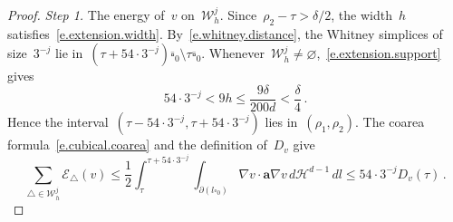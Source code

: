 \documentclass[11pt,letterpaper]{article}
\numberwithin{equation}{section}
\theoremstyle{definition}
\renewcommand{\a}{\mathbf{a}}
\newcommand{\cu}{\square}
\newcommand{\Ener}{\mathcal E}
\begin{document}
\begin{proof}
\emph{Step 1.} The energy of~$v$ on~$\mathscr W_h^j$. Since~$\rho_2-\tau>\delta/2$, the width~$h$ satisfies~\eqref{e.extension.width}. By~\eqref{e.whitney.distance}, the Whitney simplices of size~$3^{-j}$ lie in~$(\tau+54\cdot3^{-j})\overline{\cu}_0\setminus\tau\overline{\cu}_0$. Whenever~$\mathscr W_h^j\neq\varnothing$,~\eqref{e.extension.support} gives
\begin{equation*}
	54\cdot3^{-j}<9h\leq\frac{9\delta}{200d}<\frac\delta4\,.
\end{equation*}
Hence the interval~$(\tau-54\cdot3^{-j},\tau+54\cdot3^{-j})$ lies in~$(\rho_1,\rho_2)$. The coarea formula~\eqref{e.cubical.coarea} and the definition of~$D_v$ give
\begin{equation}
	\sum_{\triangle\in\mathscr W_h^j}\Ener_\triangle(v)\leq\frac12\int_\tau^{\tau+54\cdot3^{-j}}\int_{\partial(l\cu_0)}\nabla v\cdot\a\nabla v\,d\mathcal H^{d-1}\,dl\leq54\cdot3^{-j}D_v(\tau)\,.
	\label{e.energy.scale}
\end{equation}

\smallskip


\end{proof}
\end{document}
